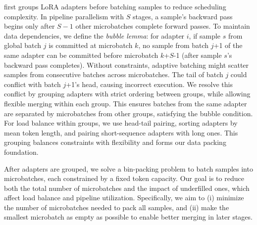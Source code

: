 \Name first groups LoRA adapters before batching samples to reduce scheduling complexity.
In pipeline parallelism with $S$ stages, a sample's backward pass begins only after $S - 1$ other microbatches complete forward passes.
To maintain data dependencies, we define the \textit{bubble lemma}:
for adapter $i$, if sample $s$ from global batch $j$ is committed at microbatch $k$, no sample from batch $j$+1 of the same adapter can be committed before microbatch $k$+$S$-1 (after sample $s$'s backward pass completes).
Without constraints, adaptive batching might scatter samples from consecutive batches across microbatches.
The tail of batch $j$ could conflict with batch $j$+1's head, causing incorrect execution.
We resolve this conflict by grouping adapters with strict ordering between groups, while allowing flexible merging within each group.
This ensures batches from the same adapter are separated by microbatches from other groups, satisfying the bubble condition.
For load balance within groups, we use head-tail pairing, sorting adapters by mean token length, and pairing short-sequence adapters with long ones.
This grouping balances constraints with flexibility and forms our data packing foundation.


After adapters are grouped, we solve a bin-packing problem to batch samples into microbatches, each constrained by a fixed token capacity.
Our goal is to reduce both the total number of microbatches and the impact of underfilled ones, which affect load balance and pipeline utilization. Specifically, we aim to (i) minimize the number of microbatches needed to pack all samples, and (ii) make the smallest microbatch as empty as possible to enable better merging in later stages.

